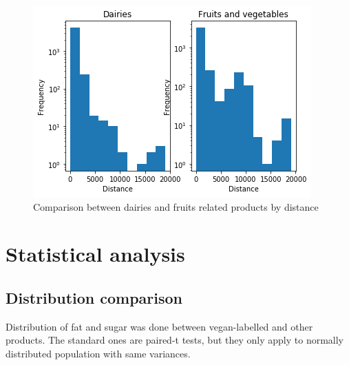 \documentclass[11pt]{article}
\begin{document}
\vspace{-0.3cm}
\begin{figure}[H]
    \centering
    \includegraphics[scale=0.4]{figures/compare_dairies_fruits_distance.png}
    \caption{Comparison between dairies and fruits related products by distance}
    \label{fig:dairies_fruit}
\end{figure}






\section{Statistical analysis}
\subsection{Distribution comparison}

Distribution of fat and sugar was done between vegan-labelled and other products. The standard ones are paired-t tests, but they only apply to normally distributed population with same variances.
\end{document}
